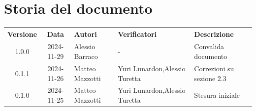 \section*{Storia del documento}
\begin{tabularx}{\textwidth}{ c c p{2.75cm} p{2.75cm} X }
    \rowcolor{gray!20}\rule{0pt}{0.5cm}\textbf{Versione} & \textbf{Data} & \textbf{Autori} & \textbf{Verificatori} & \textbf{Descrizione} \\[0.7ex]
    \hline
    \rule{0pt}{0.5cm}1.0.0 & 2024-11-29 & Alessio Barraco & - & Convalida documento \\[0.7ex]
    \rule{0pt}{0.5cm}0.1.1 & 2024-11-26 & Matteo Mazzotti & Yuri Lunardon,\newline Alessio Turetta & Correzioni su sezione 2.3 \\[0.7ex]
    \rule{0pt}{0.5cm}0.1.0 & 2024-11-25 & Matteo Mazzotti & Yuri Lunardon,\newline Alessio Turetta & Stesura iniziale \\[0.7ex]
\end{tabularx}